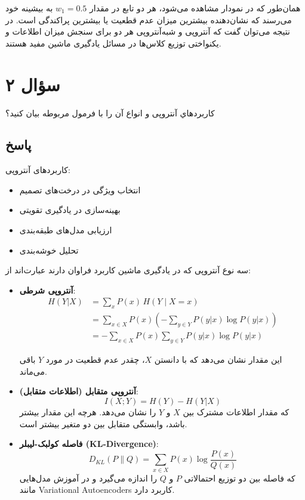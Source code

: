 \documentclass[12pt]{article}
\begin{document}
همان‌طور که در نمودار مشاهده می‌شود، هر دو تابع در مقدار $w_1 = 0.5$ به بیشینه خود می‌رسند که نشان‌دهنده بیشترین میزان عدم قطعیت یا بیشترین پراکندگی است. در نتیجه می‌توان گفت که آنتروپی و شبه‌آنتروپی هر دو برای سنجش میزان اطلاعات و یکنواختی توزیع کلاس‌ها در مسائل یادگیری ماشین مفید هستند.


	\section*{ سؤال ۲ }
	‫کاربردهاي‬ ‫آنتروپی‬ ‫و‬ ‫انواع‬ ‫آن‬ ‫را‬ ‫با‬ ‫فرمول‬ ‫مربوطه‬ ‫بیان‬ ‫کنید؟‬
	
	\subsection*{پاسخ}
	
	کاربردهای آنتروپی: \\
	
	\begin{itemize}
		\item انتخاب ویژگی در درخت‌های تصمیم 
		\item بهینه‌سازی در یادگیری تقویتی 
		\item ارزیابی مدل‌های طبقه‌بندی
		\item تحلیل خوشه‌بندی
	\end{itemize}
	
	سه نوع آنتروپی که در یادگیری ماشین کاربرد فراوان دارند عبارت‌اند از:
	
	\begin{itemize}
		\item \textbf{آنتروپی شرطی}:
		\begin{align*}
			H(Y|X) &= \sum_x P(x)\, H(Y \mid X = x) \\
			&= \sum_{x \in X} P(x)\left( -\sum_{y \in Y} P(y|x) \log P(y|x) \right) \\
			&= -\sum_{x \in X} P(x) \sum_{y \in Y} P(y|x) \log P(y|x)
		\end{align*}
		
		این مقدار نشان می‌دهد که با دانستن $X$، چقدر عدم قطعیت در مورد $Y$ باقی می‌ماند.
		
		\item \textbf{آنتروپی متقابل (اطلاعات متقابل)}:
		\[
		I(X;Y) = H(Y) - H(Y|X)
		\]
		که مقدار اطلاعات مشترک بین $X$ و $Y$ را نشان می‌دهد. هرچه این مقدار بیشتر باشد، وابستگی متقابل بین دو متغیر بیشتر است.
		
		\item \textbf{فاصله کولبک-لیبلر (KL-Divergence)}:
		\[
		D_{KL}(P \parallel Q) = \sum_{x \in X} P(x) \log \frac{P(x)}{Q(x)}
		\]
		که فاصله بین دو توزیع احتمالاتی $P$ و $Q$ را اندازه می‌گیرد و در آموزش مدل‌هایی مانند Variational Autoencoders کاربرد دارد.
	\end{itemize}
	
	
	
\end{document}
